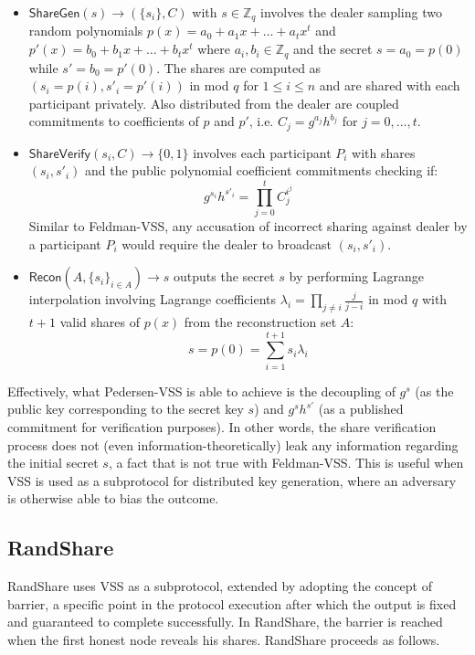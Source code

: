 \documentclass[letterpaper,twocolumn,10pt]{article}
\theoremstyle{definition}
\theoremstyle{remark}
\begin{document}
\begin{itemize}
\item $\mathsf{ShareGen}(s) \rightarrow (\{s_i\}, C)$ with $s \in \mathbb{Z}_q$ involves the dealer sampling two random polynomials $p(x) = a_0 + a_1x+ \ldots+a_tx^t$ and $p'(x) = b_0 + b_1x +\ldots+b_tx^t$ where $a_i, b_i \in \mathbb{Z}_q$ and the secret $s = a_0 = p(0)$ while $s' = b_0 = p'(0)$. The shares are computed as $(s_i = p(i), s'_i = p'(i))$ in mod $q$ for $1 \le i \le n$ and are shared with each participant privately. Also distributed from the dealer are coupled commitments to coefficients of $p$ and $p'$, i.e. $C_j = g^{a_j} h^{b_j}$ for $j = 0, ..., t$.
\item $\mathsf{ShareVerify}(s_i, C) \rightarrow \{0, 1\}$ involves each participant $P_i$ with shares $(s_i, s'_i)$ and the public polynomial coefficient commitments checking if:
$$g^{s_i} h^{s'_i} = \prod_{j = 0}^{t} C_j^{i^j}$$
Similar to Feldman-VSS, any accusation of incorrect sharing against dealer by a participant $P_i$ would require the dealer to broadcast $(s_i, s'_i)$.
\item $\mathsf{Recon}(A, \{s_i\}_{i \in A}) \rightarrow s$ outputs the secret $s$ by performing Lagrange interpolation involving Lagrange coefficients $\lambda_i = \prod_{j \neq i} \frac{j}{j - i}$ in mod $q$ with $t + 1$ valid shares of $p(x)$ from the reconstruction set $A$:
$$s = p(0) = \sum_{i = 1}^{t + 1} s_i \lambda_i$$
\end{itemize}

Effectively, what Pedersen-VSS is able to achieve is the decoupling of $g^s$ (as the public key corresponding to the secret key $s$) and $g^{s} h^{s'}$ (as a published commitment for verification purposes). In other words, the share verification process does not (even information-theoretically) leak any information regarding the initial secret $s$, a fact that is not true with Feldman-VSS. This is useful when VSS is used as a subprotocol for distributed key generation, where an adversary is otherwise able to bias the outcome.

\subsection{RandShare}
\label{appendix:randshare}
RandShare uses VSS as a subprotocol, extended by adopting the concept of barrier, a specific point in the protocol execution after which the output is fixed and guaranteed to complete successfully. In RandShare, the barrier is reached when the first honest node reveals his shares.
RandShare proceeds as follows.
\end{document}
